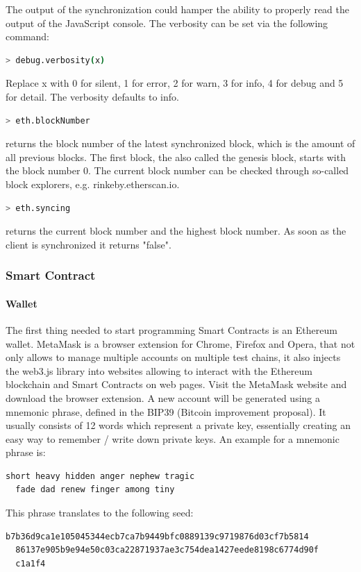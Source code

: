 The output of the synchronization could hamper the ability to properly read the output of the JavaScript console. The verbosity can be set via the following command:

\begin{lstlisting}[language=bash]
  > debug.verbosity(x)
\end{lstlisting}

Replace x with 0 for silent, 1 for error, 2 for warn, 3 for info, 4 for debug and 5 for detail. The verbosity defaults to info\cite{cli-options}.
\newpage

\begin{lstlisting}[language=bash]
  > eth.blockNumber
\end{lstlisting}

returns the block number of the latest synchronized block, which is the amount of all previous blocks. The first block, the also called the genesis block, starts with the block number 0. The current block number can be checked through so-called block explorers, e.g. {rinkeby.etherscan.io}.
\\
\begin{lstlisting}[language=bash]
  > eth.syncing
\end{lstlisting}
returns the current block number and the highest block number. As soon as the client is synchronized it returns "false"\cite{javascript-0.20}.
\\
\subsubsection{Smart Contract}
\paragraph{Wallet}
The first thing needed to start programming Smart Contracts is an Ethereum wallet. MetaMask is a browser extension for Chrome, Firefox and Opera, that not only allows to manage multiple accounts on multiple test chains, it also injects the web3.js library into websites allowing to interact with the Ethereum blockchain and Smart Contracts on web pages.
Visit the MetaMask\cite{metamask} website and download the browser extension. A new account will be generated using a mnemonic phrase, defined in the BIP39 (Bitcoin improvement proposal)\cite{bip39}. It usually consists of 12 words which represent a private key, essentially creating an easy way to remember / write down private keys. An example for a mnemonic phrase is:
\begin{lstlisting}[language=bash]
  short heavy hidden anger nephew tragic
  fade dad renew finger among tiny
\end{lstlisting}
This phrase translates to the following seed:
\begin{lstlisting}[language=bash]
  b7b36d9ca1e105045344ecb7ca7b9449bfc0889139c9719876d03cf7b5814
  86137e905b9e94e50c03ca22871937ae3c754dea1427eede8198c6774d90f
  c1a1f4
\end{lstlisting}


